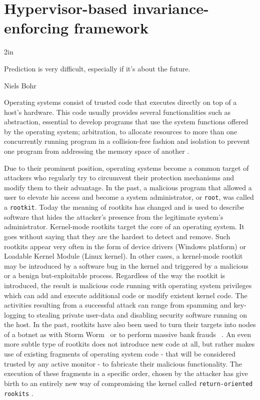\chapter{Hypervisor-based invariance-enforcing framework} \label{hellorootkitty}

\epigraph{2in}{Prediction is very difficult, especially if it's about the future.}{Niels Bohr}{}


Operating systems consist of trusted code that executes directly on top of a host's hardware. This code usually provides several functionalities such as abstraction, essential to develop programs that use the system functions offered by the operating system; arbitration, to allocate resources to more than one concurrently running program in a collision-free fashion and isolation to prevent one program from addressing the memory space of another \cite{stallings}.

Due to their prominent position, operating systems become a common target of attackers who regularly try to circumvent their protection mechanisms and modify them to their advantage. In the past, a malicious program that allowed a user to elevate his access and become a system administrator, or \texttt{root}, was called a \texttt{rootkit}. Today the meaning of rootkits has changed and is used to describe software that hides the attacker's presence from the legitimate system's administrator. 
Kernel-mode rootkits target the core of an operating system. It goes without saying that they are the hardest to detect and remove. Such rootkits appear very often in the form of device drivers (Windows platform) or Loadable Kernel Module (Linux kernel). 
In other cases, a kernel-mode rootkit may be introduced by a software bug in the kernel and  triggered by a malicious or a benign but-exploitable process.
Regardless of the way the rootkit is introduced, the result is malicious code running with operating system privileges which can add and execute additional code or modify existent kernel code. The activities resulting from a successful attack can range from spamming and key-logging to stealing private user-data and disabling security software running on the host.
In the past, rootkits have also been used to turn their targets into nodes of a botnet as with Storm Worm~\cite{1387718} or to perform massive bank frauds ~\cite{mcaffee}.
An even more subtle type of rootkits does not introduce new code at all, but rather makes use of existing fragments of operating system code - that will be considered trusted by any active monitor - to fabricate their malicious functionality. The execution of these fragments in a specific order, chosen by the attacker has give birth to an entirely new way of compromising the kernel called \texttt{return-oriented rookits} \cite{Hund2009}. 

